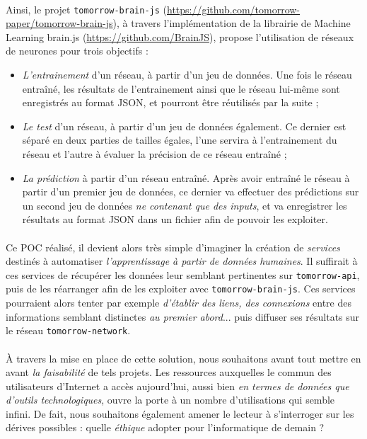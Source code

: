 \paragraph{} Ainsi, le projet \lstinline{tomorrow-brain-js} (\url{https://github.com/tomorrow-paper/tomorrow-brain-js}), 
à travers l'implémentation de la librairie de Machine Learning brain.js (\url{https://github.com/BrainJS}), propose
l'utilisation de réseaux de neurones pour trois objectifs :

\begin{itemize}
    \item \emph{L'entrainement} d'un réseau, à partir d'un jeu de données. Une fois le réseau
    entraîné, les résultats de l'entrainement ainsi que le réseau lui-même sont enregistrés au format
    JSON, et pourront être réutilisés par la suite ;
    \item \emph{Le test} d'un réseau, à partir d'un jeu de données également. Ce dernier est
    séparé en deux parties de tailles égales, l'une servira à l'entrainement du réseau et l'autre
    à évaluer la précision de ce réseau entraîné ;
    \item \emph{La prédiction} à partir d'un réseau entraîné. Après avoir entraîné le réseau
    à partir d'un premier jeu de données, ce dernier va effectuer des prédictions sur un second
    jeu de données \emph{ne contenant que des inputs}, et va enregistrer les résultats au format
    JSON dans un fichier afin de pouvoir les exploiter.
\end{itemize}

\paragraph{} Ce POC réalisé, il devient alors très simple d'imaginer la création de \emph{services}
destinés à automatiser \emph{l'apprentissage à partir de données humaines}. Il suffirait à ces services
de récupérer les données leur semblant pertinentes sur \lstinline{tomorrow-api}, puis de les réarranger
afin de les exploiter avec \lstinline{tomorrow-brain-js}. Ces services pourraient alors tenter par 
exemple \emph{d'établir des liens, des connexions} entre des informations semblant distinctes 
\emph{au premier abord}... puis diffuser ses résultats sur le réseau \lstinline{tomorrow-network}. 

\paragraph{} À travers la mise en place de cette solution, nous souhaitons avant tout mettre en
avant \emph{la faisabilité} de tels projets. Les ressources auxquelles le commun des utilisateurs 
d'Internet a accès aujourd'hui, aussi bien \emph{en termes de données que d'outils technologiques},
ouvre la porte à un nombre d'utilisations qui semble infini. De fait, nous souhaitons également
amener le lecteur à s'interroger sur les dérives possibles : quelle \emph{éthique} adopter pour
l'informatique de demain ?